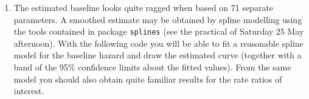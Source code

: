 \begin{enumerate}
\item
The estimated baseline looks quite ragged when based on 71 separate
parameters. A smoothed estimate may be obtained by spline modelling using the tools
contained in package \texttt{splines} (see the practical of Saturday 25 May afternoon).
With the following code you will be able to fit a
reasonable spline model for the baseline hazard and
draw the estimated curve (together with a band of the 95\%
confidence limits about the fitted values).
From the same model you should also obtain quite familiar results for the
rate ratios of interest.
\begin{Schunk}
\end{Schunk}
\end{enumerate}


% 
